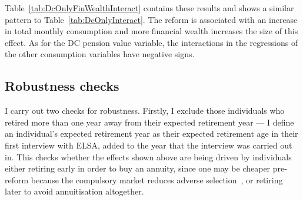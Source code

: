 \documentclass[12pt]{article}
\begin{document}
Table~\ref{tab:DcOnlyFinWealthInteract} contains these results and shows a
similar pattern to Table~\ref{tab:DcOnlyInteract}. The reform is associated with
an increase in total monthly consumption and more financial wealth increases the
size of this effect. As for the DC pension value variable, the interactions
in the regressions of the other consumption variables have negative signs.

\begin{landscape}
  \linespread{1}
  
\end{landscape}

\begin{landscape}
  \linespread{1}
  
\end{landscape}
\begin{landscape}
  \linespread{1}
  
\end{landscape}

\begin{landscape}
  \linespread{1}
  
\end{landscape}
\begin{landscape}
  \linespread{1}
  
\end{landscape}

\begin{landscape}
  \linespread{1}
  
\end{landscape}

\subsection{Robustness checks}

I carry out two checks for robustness. Firstly, I exclude those individuals who
retired more than one year away from their expected retirement year --- I define
an individual's expected retirement year as their expected retirement age in
their first interview with ELSA, added to the year that the interview was
carried out in. This checks whether the effects shown above are being driven by
individuals either retiring early in order to buy an annuity, since one may be
cheaper pre-reform because the compulsory market reduces adverse selection~\cite{finkelstein-porteba-2002}, or retiring later to avoid annuitisation
altogether.
\end{document}
